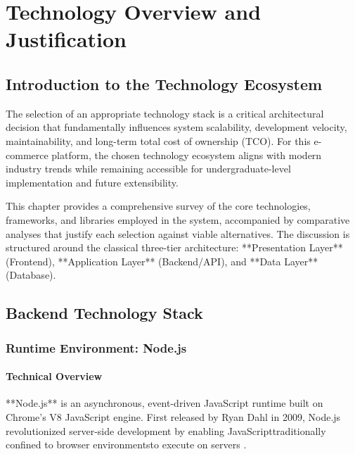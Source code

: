 \documentclass[12pt, a4paper]{report}
\begin{document}

\chapter{Technology Overview and Justification}

\section{Introduction to the Technology Ecosystem}

The selection of an appropriate technology stack is a critical architectural decision that fundamentally influences system scalability, development velocity, maintainability, and long-term total cost of ownership (TCO). For this e-commerce platform, the chosen technology ecosystem aligns with modern industry trends while remaining accessible for undergraduate-level implementation and future extensibility.

This chapter provides a comprehensive survey of the core technologies, frameworks, and libraries employed in the system, accompanied by comparative analyses that justify each selection against viable alternatives. The discussion is structured around the classical three-tier architecture: **Presentation Layer** (Frontend), **Application Layer** (Backend/API), and **Data Layer** (Database).

\section{Backend Technology Stack}

\subsection{Runtime Environment: Node.js}

\subsubsection{Technical Overview}

**Node.js** is an asynchronous, event-driven JavaScript runtime built on Chrome's V8 JavaScript engine. First released by Ryan Dahl in 2009, Node.js revolutionized server-side development by enabling JavaScripttraditionally confined to browser environmentsto execute on servers \cite{nodejs2024}.
\end{document}

